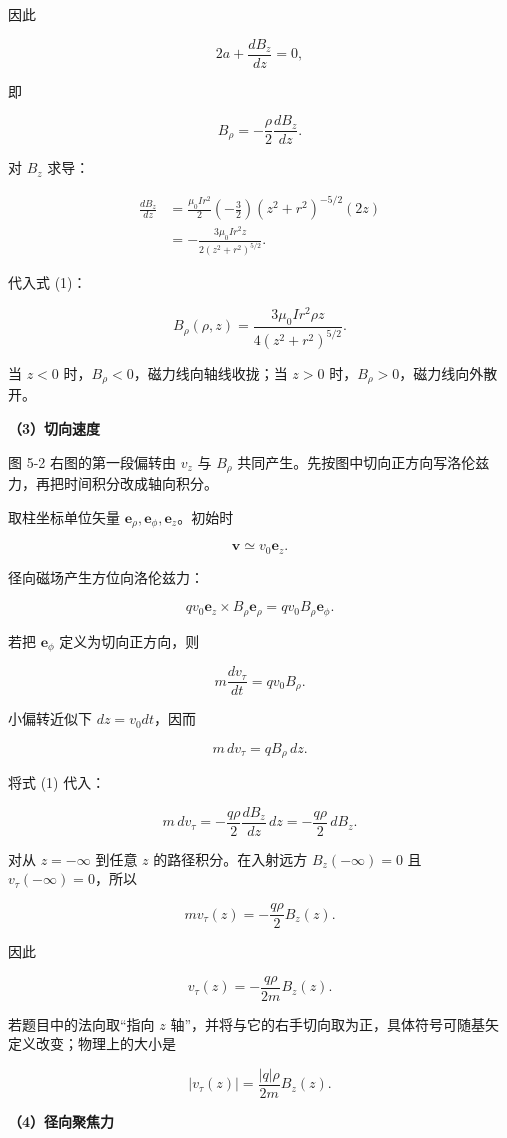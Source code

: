 \documentclass[12pt,a4paper,UTF8]{ctexart}
\begin{document}
因此

\[
2a+\frac{dB_z}{dz}=0,
\]

即

\[
\boxed{B_\rho=-\frac\rho2\frac{dB_z}{dz}}. \tag{1}
\]

对 \(B_z\) 求导：

\[
\begin{aligned}
\frac{dB_z}{dz}
&=\frac{\mu_0Ir^2}{2}
\left(-\frac32\right)(z^2+r^2)^{-5/2}(2z)\\
&=-\frac{3\mu_0Ir^2z}{2(z^2+r^2)^{5/2}}.
\end{aligned}
\]

代入式 (1)：

\[
\boxed{
B_\rho(\rho,z)
=\frac{3\mu_0Ir^2\rho z}{4(z^2+r^2)^{5/2}}
}.
\]

当 \(z<0\) 时，\(B_\rho<0\)，磁力线向轴线收拢；当 \(z>0\)
时，\(B_\rho>0\)，磁力线向外散开。

\textbf{（3）切向速度}

图 5-2 右图的第一段偏转由 \(v_z\) 与 \(B_\rho\)
共同产生。先按图中切向正方向写洛伦兹力，再把时间积分改成轴向积分。

取柱坐标单位矢量 \(\bm e_\rho,\bm e_\phi,\bm e_z\)。初始时

\[
\bm v\simeq v_0\bm e_z.
\]

径向磁场产生方位向洛伦兹力：

\[
qv_0\bm e_z\times B_\rho\bm e_\rho
=qv_0B_\rho\bm e_\phi.
\]

若把 \(\bm e_\phi\) 定义为切向正方向，则

\[
m\frac{dv_\tau}{dt}=qv_0B_\rho.
\]

小偏转近似下 \(dz=v_0dt\)，因而

\[
m\,dv_\tau=qB_\rho\,dz.
\]

将式 (1) 代入：

\[
m\,dv_\tau
=-\frac{q\rho}{2}\frac{dB_z}{dz}\,dz
=-\frac{q\rho}{2}\,dB_z.
\]

对从 \(z=-\infty\) 到任意 \(z\) 的路径积分。在入射远方
\(B_z(-\infty)=0\) 且 \(v_\tau(-\infty)=0\)，所以

\[
mv_\tau(z)=-\frac{q\rho}{2}B_z(z).
\]

因此

\[
\boxed{v_\tau(z)=-\frac{q\rho}{2m}B_z(z)}.
\]

若题目中的法向取``指向 \(z\)
轴''，并将与它的右手切向取为正，具体符号可随基矢定义改变；物理上的大小是

\[
|v_\tau(z)|=\frac{|q|\rho}{2m}B_z(z).
\]

\textbf{（4）径向聚焦力}
\end{document}
